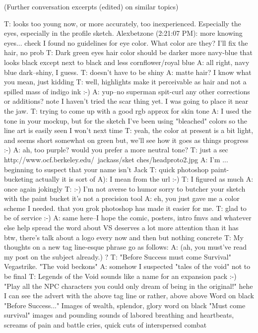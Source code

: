 (Further conversation excerpts (edited) on similar topics)

T: looks too young now, or more accurately, too inexperienced. Especially the eyes, especially in the profile sketch.
Alexbetzone (2:21:07 PM): more knowing eyes... check
I found no guidelines for eye color. What color are they?
I'll fix the hair, no prob
T: Dark green eyes
hair color should be darker
more navy-blue that looks black except next to black and less cornflower/royal blue
A: all right, navy blue dark--shiny, I guess.
T: doesn't have to be shiny
A: matte hair?
I know what you mean, just kidding
T: well, highlights make it perceivable as hair and not a spilled mass of indigo ink
:-)
A: yup--no superman spit-curl
any other corrections or additions? note I haven't tried the scar thing yet. I was going to place it near the jaw.
T: trying to come up with a good rgb approx for skin tone
A: I used the tone in your mockup, but for the sketch I've been using "bleached" colors so the line art is easily seen
I won't next time
T: yeah, the color at present is a bit light, and seems short somewhat on green
but, we'll see how it goes as things progress :-)
A: ah, too purple? would you prefer a more neutral tone?
T: just a sec
http://www.ocf.berkeley.edu/~jackass/sket ches/headproto2.jpg
A: I'm ... beginning to suspect that your name isn't Jack
T: quick photoshop paint-bucketing
actually it is
sort of
A): I mean from the url :-)
T: I figured as much
A: once again jokingly
T: :-)
I'm not averse to humor
sorry to butcher your sketch with the paint bucket
it's not a precision tool
A: eh, you just gave me a color scheme I needed. that you grok photoshop has made it easier for me.
T: glad to be of service :-)
A: same here--I hope the comic, posters, intro fmvs and whatever else help spread the word about VS
deserves a lot more attention than it has
 btw, there's talk about a logo every now and then but nothing concrete
T: My thoughts on a new tag line-esque phrase go as follows:
A: (ah, you must've read my post on the subject already.) ?
T: "Before Success must come Survival"
Vegastrike.
"The void beckons"
A: somehow I suspected "tales of the void" not to be final
T: Legends of the Void sounds like a name for an expansion pack :-)
"Play all the NPC characters you could only dream of being in the original!"
hehe
I can see the advert 
with the above tag line
or rather, above above
Word on black "Before Success..."
Images of wealth, splendor, glory
word on black "Must come survival"
images and pounding sounds of labored breathing and heartbeats, screams of pain and battle cries, quick cuts of interspersed combat

